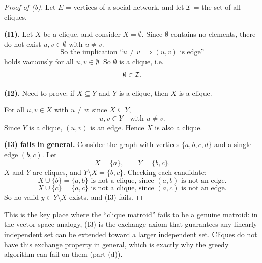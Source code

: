 \begin{solbox}[long]

\begin{solution}[(a)]
\end{solution}

\begin{solution}[(b)]
\begin{proof}[Proof of (b)]
    Let $E$ = vertices of a social network, and let $\mathcal{I}$ = the set of
    all cliques.

    \medskip
    \textbf{(I1).} Let $X$ be a clique, and consider $X = \emptyset$.
    Since $\emptyset$ contains no elements, there do not exist
    $u,v\in\emptyset$ with $u\ne v$.
    \[
        \text{So the implication ``}u\ne v \implies (u,v)\text{ is
        edge''}
    \]
    holds vacuously for all $u,v\in\emptyset$. So $\emptyset$ is a
    clique, i.e.
    \[
        \emptyset\in\mathcal{I}.
    \]

    \medskip
    \textbf{(I2).} Need to prove: if $X\subseteq Y$ and $Y$ is a
    clique, then $X$ is a clique.

    For all $u,v\in X$ with $u\ne v$: since $X\subseteq Y$,
    \[
        u,v\in Y \quad \text{with } u\ne v.
    \]
    Since $Y$ is a clique, $(u,v)$ is an edge. Hence $X$ is also a
    clique.

    \medskip
    \textbf{(I3) fails in general.} Consider the graph with vertices
    $\{a,b,c,d\}$ and a single edge $(b,c)$. Let
    \[
        X=\{a\}, \qquad Y=\{b,c\}.
    \]
    $X$ and $Y$ are cliques, and $Y\setminus X = \{b,c\}$. Checking
    each candidate:
    \[
        X\cup\{b\} = \{a,b\} \text{ is not a clique, since } (a,b)
        \text{ is not an edge.}
    \]
    \[
        X\cup\{c\} = \{a,c\} \text{ is not a clique, since } (a,c)
        \text{ is not an edge.}
    \]
    So no valid $y\in Y\setminus X$ exists, and (I3) fails.
\end{proof}

\begin{remark}
    This is the key place where the ``clique matroid'' fails to be a
    genuine matroid: in the vector-space analogy, (I3) is the
    exchange axiom that guarantees any linearly independent set can
    be extended toward a larger independent set. Cliques do not have
    this exchange property in general, which is exactly why the
    greedy algorithm can fail on them (part (d)).
\end{remark}
\end{solution}


\end{solbox}
